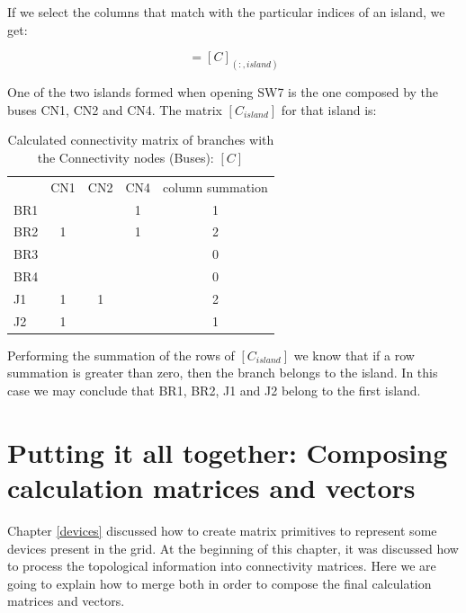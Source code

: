 \documentclass[nols,a4paper,twoside,symmetric,notoc,fleqn]{tufte-book}
\begin{document}
\vspace{0.5cm}

If we select the columns that match with the particular indices of an island, we get:

\begin{equation}
[C_{island}] = [C]_{(:, island)}
\end{equation}

One of the two islands formed when opening SW7 is the one composed by the buses CN1, CN2 and CN4. The matrix $[C_{island}]$ for that island is:

\begin{table}[h!]
	\begin{tabular}{lccc|c}
		{} &  CN1 &  CN2 &  CN4 & column summation\\
		BR1 &      &      &     1    &  1\\
		BR2 &    1 &      &      1   &  2 \\
		BR3 &      &      &          &  0\\
		BR4 &      &      &          &  0\\
		J1  &    1 &    1 &          &  2\\
		J2  &    1 &      &          &  1\\
	\end{tabular}
	\caption{Calculated connectivity matrix of branches with the Connectivity nodes (Buses): $[C]$}
\end{table}
\vspace{0.5cm}

Performing the summation of the rows of $[C_{island}]$ we know that if a row summation is greater than zero, then the branch belongs to the island. In this case we may conclude that BR1, BR2, J1 and J2 belong to the first island.


\section{Putting it all together: Composing calculation matrices and vectors}

Chapter \ref{devices} discussed how to create matrix primitives to represent some devices present in the grid. At the beginning of this chapter, it was discussed how to process the topological information into connectivity matrices. Here we are going to explain how to merge both in order to compose the final calculation matrices and vectors.
\end{document}
